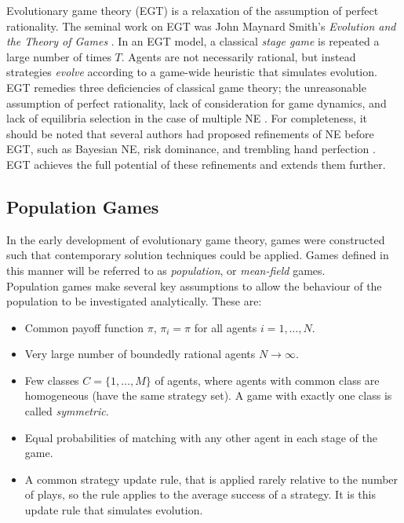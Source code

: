 Evolutionary game theory (EGT) is a relaxation of the assumption of perfect rationality. The seminal work on EGT was John Maynard Smith's \emph{Evolution and the Theory of Games} \cite{RN99}. In an EGT model, a classical \emph{stage game} is repeated a large number of times $T$. Agents are not necessarily rational, but instead strategies \emph{evolve} according to a game-wide heuristic that simulates evolution. EGT remedies three deficiencies of classical game theory; the unreasonable assumption of perfect rationality, lack of consideration for game dynamics, and lack of equilibria selection in the case of multiple NE \cite{RN99}. For completeness, it should be noted that several authors had proposed refinements of NE before EGT, such as Bayesian NE, risk dominance, and trembling hand perfection \cite{RN39}. EGT achieves the full potential of these refinements and extends them further.   \\

 
\subsection{Population Games}
In the early development of evolutionary game theory, games were constructed such that contemporary solution techniques could be applied. Games defined in this manner will be referred to as \emph{population}, or \emph{mean-field} games. \\

 Population games make several key assumptions to allow the behaviour of the population to be investigated analytically. These are: \begin{itemize}
    \item Common payoff function $\pi$,  $\pi_i = \pi$ for all agents $i = 1, \dots, N$. 
    \item Very large number of boundedly rational agents $N \to \infty$.
    \item Few classes $C = \{1,\dots, M\}$ of agents, where agents with common class are homogeneous (have the same strategy set). A game with exactly one class is called \emph{symmetric}. 
    \item Equal probabilities of matching with any other agent in each stage of the game. 
    \item A common strategy update rule, that is applied rarely relative to the number of plays, so the rule applies to the average success of a strategy. It is this update rule that simulates evolution.
    
\end{itemize}



